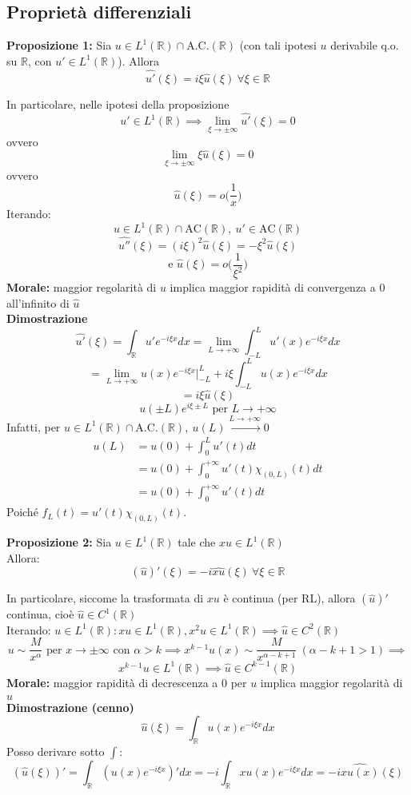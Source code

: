 \documentclass[a4paper]{article}
\newcommand{\R}{\mathbb{R}}
\begin{document}
\subsection{Proprietà differenziali}
\begin{tcolorbox}
	\textbf{Proposizione 1:} Sia $u\in L^{1}(\R)\cap \text{A.C.}(\R)$ (con tali ipotesi $u$ derivabile q.o. su $\R$, con $u'\in L^{1}(\R)$). Allora
	\[\widehat{u'}(\xi)=i\xi \hat{u}(\xi) \ \forall \xi \in \R\]
\end{tcolorbox}
	In particolare, nelle ipotesi della proposizione
	\[u'\in L^{1}(\R)\implies \lim_{\xi \to \pm \infty} \widehat{u'}(\xi)=0\]
	ovvero 
	\[\lim_{\xi \to \pm \infty} \xi \hat{u}(\xi)=0\]
	ovvero
	\[\hat{u}(\xi)=o \bigg(\frac{1}{x}\bigg)\]
	Iterando:\[u\in L^{1}(\R)\cap \text{AC}(\R), \ u'\in \text{AC}(\R)\]
	\[\widehat{u''}(\xi)=(i\xi)^2\hat{u}(\xi)=-\xi^2\hat{u}(\xi)\]
	\[\text{e }\hat{u}(\xi)=o\bigg(\frac{1}{\xi^2}\bigg)\]
\textbf{Morale:} maggior regolarità di $u$ implica maggior rapidità di convergenza a 0 all'infinito di $\hat{u}$ 
\\\textbf{Dimostrazione} 
\[\hat{u'}(\xi)=\int_{\R}^{} u'e^{-i\xi x}dx=\lim_{L \to +\infty} \int_{-L}^{L} u'(x)e^{-i\xi x}dx\]
\[=\lim_{L \to +\infty} u(x)e^{-i\xi x}\biggr\rvert_{-L}^L+i\xi\int_{-L}^{L} u(x)e^{-i\xi x}dx\] 
\[=i\xi \hat{u}(\xi)\]
\[u(\pm L)e^{i\xi \pm L}\text{ per }L\to +\infty\]
Infatti, per $u\in L^{1}(\R)\cap \text{A.C.}(\R),\ u(L)\xrightarrow{L\to +\infty}0$
\begin{align*}u(L)&=u(0)+\int_{0}^{L} u'(t)dt
\\&=u(0)+\int_{0}^{+\infty} u'(t)\chi_{(0,L)}(t)dt
\\&=u(0)+\int_{0}^{+\infty} u'(t)dt 
\end{align*}
Poiché $f_L(t)=u'(t)\chi_{(0,L)}(t)$.
\begin{tcolorbox}
\textbf{Proposizione 2: }Sia $u\in L^{1}(\R)$ tale che $xu\in L^{1}(\R)$ 
\\Allora:
\[(\hat{u})'(\xi)=-i \widehat{xu}(\xi)\ \forall \xi \in \R\]
\end{tcolorbox}
In particolare, siccome la trasformata di $xu$ è continua (per RL), allora $(\hat{u})'$ continua, cioè $\hat{u}\in C^1(\R)$ 
\\Iterando: $u\in L^{1}(\R):xu\in L^{1}(\R), x^2u\in L^{1}(\R)\implies \hat{u}\in C^2(\R)$ 
\[u\sim \frac{M}{x^\alpha}\text{ per }x\to \pm \infty\text{ con }\alpha>k\implies x^{k-1}u(x)\sim \frac{M}{x^{\alpha-k+1}}\ (\alpha -k+1>1)\implies \]
\[x^{k-1}u\in L^{1}(\R)\implies \hat{u}\in C^{k-1}(\R)\]
\textbf{Morale:} maggior rapidità di decrescenza a 0 per $u$ implica maggior regolarità di $\hat{u}$ 
\\\textbf{Dimostrazione (cenno)}
\[\hat{u}(\xi)=\int_{\R}^{} u(x)e^{-i\xi x}dx\]
Posso derivare sotto $\int$:
\[(\hat{u}(\xi))'=\int_{\R}^{} (u(x)e^{-i\xi x})'dx =-i \int_{\R}^{} xu(x)e ^{-i\xi x}dx=-i \widehat{xu(x)}(\xi)\] 
\end{document}
